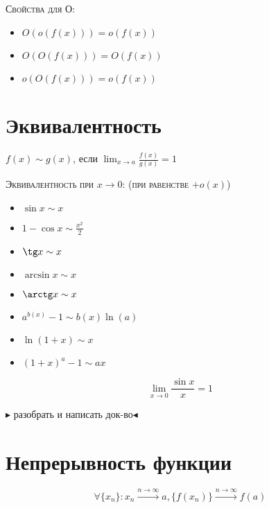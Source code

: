 \documentclass[14pt]{extreport}
\begin{document}
            \textsc{Свойства для О:}
                \begin{itemize}
                    \item $O(o(f(x))) = o(f(x))$
                    \item $O(O(f(x))) = O(f(x))$
                    \item $o(O(f(x)))=o(f(x))$
                \end{itemize}

        \section{Эквивалентность}
                \begin{definition}
                    $f(x) \sim g(x)$, если $\lim_{x\rightarrow a} \frac{f(x)}{g(x)} = 1$
                \end{definition}

                \textsc{Эквивалентность при $x\rightarrow 0$: (при равенстве $+o(x)$)}
                \begin{itemize}
                    \item $\sin x \sim x$
                    \item $1 - \cos x \sim \frac{x^2}{2}$
                    \item $\tg x \sim x$
                    \item $\arcsin x \sim x$
                    \item $\arctg x \sim x$
                    \item $a^{b(x)} - 1 \sim b(x) \ln (a)$
                    \item $\ln(1+x) \sim x$
                    \item $(1+x)^{a} - 1 \sim ax$
                \end{itemize}

                \begin{definition}
                    $$\lim_{x\rightarrow 0} \frac{\sin x}{x} = 1$$
                \end{definition}
                $\blacktriangleright$ разобрать и написать док-во$\blacktriangleleft$
            
        \section{Непрерывность функции}

        \begin{definition}
            $$\forall \{x_n\}: x_n \xrightarrow{n\rightarrow \infty} a, \{f(x_n)\} \xrightarrow{n\rightarrow\infty} f(a)$$
        \end{definition}
\end{document}
